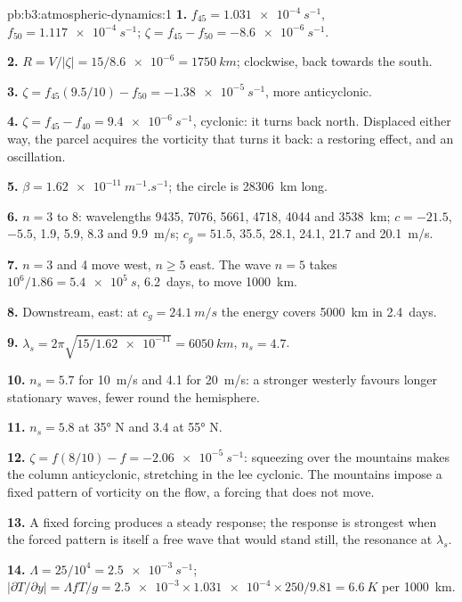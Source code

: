 \begin{solution}{pb:b3:atmospheric-dynamics:1}
\textbf{1.} $f_{45} = \qty{1.031e-4}{s^{-1}}$, $f_{50} =
\qty{1.117e-4}{s^{-1}}$; $\zeta = f_{45} - f_{50} = \qty{-8.6e-6}{s^{-1}}$.

\textbf{2.} $R = V/|\zeta| = 15/\num{8.6e-6} = \qty{1750}{km}$; clockwise,
back towards the south.

\textbf{3.} $\zeta = f_{45}(9.5/10) - f_{50} = \qty{-1.38e-5}{s^{-1}}$, more
anticyclonic.

\textbf{4.} $\zeta = f_{45} - f_{40} = \qty{+9.4e-6}{s^{-1}}$, cyclonic: it
turns back north. Displaced either way, the parcel acquires the vorticity
that turns it back: a restoring effect, and an oscillation.

\textbf{5.} $\beta = \qty{1.62e-11}{m^{-1}.s^{-1}}$; the circle is
\qty{28306}{km} long.

\textbf{6.} $n = 3$ to 8: wavelengths 9435, 7076, 5661, 4718, 4044 and
\qty{3538}{km}; $c = -21.5$, $-5.5$, 1.9, 5.9, 8.3 and \qty{9.9}{m/s}; $c_g
= 51.5$, 35.5, 28.1, 24.1, 21.7 and \qty{20.1}{m/s}.

\textbf{7.} $n = 3$ and 4 move west, $n \ge 5$ east. The wave $n = 5$ takes
$10^6/1.86 = \qty{5.4e5}{s}$, \num{6.2}~days, to move \qty{1000}{km}.

\textbf{8.} Downstream, east: at $c_g = \qty{24.1}{m/s}$ the energy covers
\qty{5000}{km} in \num{2.4}~days.

\textbf{9.} $\lambda_s = 2\pi\sqrt{15/\num{1.62e-11}} = \qty{6050}{km}$,
$n_s = 4.7$.

\textbf{10.} $n_s = 5.7$ for \qty{10}{m/s} and 4.1 for \qty{20}{m/s}: a
stronger westerly favours longer stationary waves, fewer round the
hemisphere.

\textbf{11.} $n_s = 5.8$ at \ang{35} N and 3.4 at \ang{55} N.

\textbf{12.} $\zeta = f(8/10) - f = \qty{-2.06e-5}{s^{-1}}$: squeezing over
the mountains makes the column anticyclonic, stretching in the lee
cyclonic. The mountains impose a fixed pattern of vorticity on the flow,
a forcing that does not move.

\textbf{13.} A fixed forcing produces a steady response; the response is
strongest when the forced pattern is itself a free wave that would stand
still, the resonance at $\lambda_s$.

\textbf{14.} $\Lambda = 25/10^4 = \qty{2.5e-3}{s^{-1}}$;
$|\partial T/\partial y| = \Lambda fT/g = \num{2.5e-3}\times\num{1.031e-4}
\times250/9.81 = \qty{6.6}{K}$ per \qty{1000}{km}.


\end{solution}

